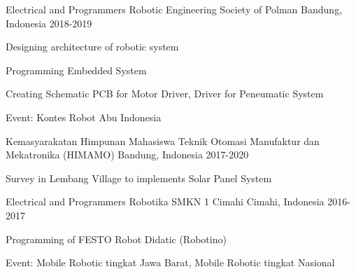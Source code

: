 

\begin{cventries}

  \cventry
    {Electrical and Programmers} %
    {Robotic Engineering Society of Polman} %
    {Bandung, Indonesia} %
    {2018-2019} %
    {
      \begin{cvitems} %
        \item {Designing architecture of robotic system}
        \item {Programming Embedded System}
        \item {Creating Schematic PCB for Motor Driver, Driver for Peneumatic System}
        \item {Event: Kontes Robot Abu Indonesia}
      \end{cvitems}
    }

  \cventry
    {Kemasyarakatan} %
    {Himpunan Mahasiswa Teknik Otomasi Manufaktur dan Mekatronika (HIMAMO)} %
    {Bandung, Indonesia} %
    {2017-2020} %
    {
      \begin{cvitems} %
        \item {Survey in Lembang Village to implements Solar Panel System}
      \end{cvitems}
    }
  \cventry
    {Electrical and Programmers} %
    {Robotika SMKN 1 Cimahi} %
    {Cimahi, Indonesia} %
    {2016-2017} %
    {
      \begin{cvitems} %
        \item {Programming of FESTO Robot Didatic (Robotino)}
        \item {Event: Mobile Robotic tingkat Jawa Barat, Mobile Robotic tingkat Nasional}
      \end{cvitems}
    }

\end{cventries}
